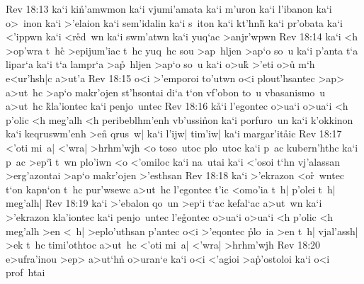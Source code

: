 \vs Rev 18:13
ka`i
ki\r{n}'amwmon
ka`i
vjumi'amata
ka`i
m'uron
ka`i
l'ibanon
ka`i
o>~inon
ka`i
>'elaion
ka`i
sem'idalin
ka`i
s~iton
ka`i
kt'hnh\r{}
ka`i
pr'obata
ka`i
<'ippwn
ka`i
<r\r{e}d~wn
ka`i
swm'atwn
ka`i
yuq`ac
>anjr'wpwn\bibvsend
\vs Rev 18:14
ka`i
<h
>op'wra
t~hc\r{}
>epijum'iac
t~hc
yuq~hc
sou
>ap~hljen
>ap`o
so~u
ka`i
p'anta
t`a
lipar`a
ka`i
t`a
lampr`a
>a\r{p}~hljen
>ap`o
so~u
ka`i
o>uk\r{}
>'eti
o>u\r{}
m`h
e<ur'hsh|c
a>ut'a\bibvsend
\vs Rev 18:15
o<i
>'emporoi
to'utwn
o<i
plout'hsantec
>ap>
a>ut~hc
>ap`o
makr'ojen
st'hsontai
di`a
t`on
vf'obon
to~u
vbasanismo~u
a>ut~hc
\r{k}la'iontec
ka`i
penjo~untec\bibvsend
\vs Rev 18:16
k\r{a}`i
l'egontec
o>ua`i
o>ua`i
<h
p'olic
<h
meg'alh
<h
peribeblhm'enh
vb'ussi\r{n}on
ka`i
porfuro~un
ka`i
k'okkinon
ka`i
keqruswm'enh
>en\r{}
qrus~w|
ka`i
l'ijw|
tim'iw|
ka`i
margar'it\r{a}ic\bibvsend
{}
\vs Rev 18:17
<'oti
mi~a|
<'wra|
>hrhm'wjh
<o
toso~utoc
plo~utoc
ka`i
p~ac
kubern'hthc
ka`i
p~ac
>ep`i\r{}
t~wn
plo'iwn
<o
<'omiloc
ka`i
na~utai
ka`i
<'osoi
t`hn
vj'alassan
>erg'azontai
>ap`o
makr'ojen
>'esthsan\bibvsend
\vs Rev 18:18
ka`i
>'ekrazon
<o\r{r}~wntec
t`on
kapn`on
t~hc
pur'wsewc
a>ut~hc
l'egontec
t'ic
<omo'ia
t~h|
p'olei
t~h|
meg'alh|\bibvsend
\vs Rev 18:19
ka`i
>'ebalon
qo~un
>ep`i
t`ac
kefal`ac
a>ut~wn
ka`i
>'ekrazon
kla'iontec
ka`i
penjo~untec
l'e\r{g}ontec
o>ua`i
o>ua`i
<h
p'olic
<h
meg'alh
>en
<~h|
>eplo'uthsan
p'antec
o<i
>'eqontec
\r{p}lo~ia
>en
t~h|
vjal'assh|
>ek
t~hc
timi'othtoc
a>ut~hc
<'oti
mi~a|
<'wra|
>hrhm'wjh\bibvsend
\vs Rev 18:20
e>ufra'inou
>ep>
a>ut`h\r{n}
o>uran`e
ka`i
o<i
<'agioi
>a\r{p}'ostoloi
ka`i
o<i
prof~htai
